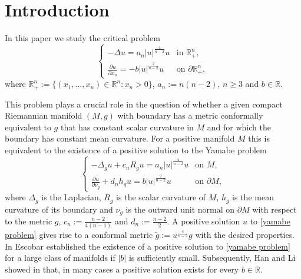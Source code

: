 \documentclass[reqno,11pt,oneside]{amsart}
\numberwithin{equation}{section}
\def\r{\mathbb{R}}
\def\rn{\mathbb{R}^n}
\def\hn{\mathbb{R}^n_+}
\def\tilde{\widetilde}
\begin{document}
\maketitle

\section{Introduction}

In this paper we study the critical problem
\begin{equation}\label{problem_cap}
\begin{cases}
 -\Delta u = a_n|u|^\frac{4}{n-2}u &\text{in \ } \hn,\\
 \frac{\partial u}{\partial x_n} = -b|u|^\frac{2}{n-2}u &\text{on \ }\partial\hn,
\end{cases}
\end{equation}
where $\hn:=\{(x_1,\ldots,x_n)\in\rn:x_n>0\}$, $a_n:=n(n-2)$, $n\geq 3$ and $b\in\r$.

This problem plays a crucial role in the question of whether a given compact Riemannian manifold $(M,g)$ with boundary has a metric conformally equivalent to $g$ that has constant scalar curvature in $M$ and for which the boundary has constant mean curvature. For a positive manifold $M$ this is equivalent to the existence of a positive solution to the Yamabe problem
\begin{equation}\label{yamabe problem}
\begin{cases}
 -\Delta_g u + c_nR_gu= a_n|u|^\frac{4}{n-2}u &\text{on \ } M,\\
 \frac{\partial u}{\partial\nu_g} + d_nh_gu= b|u|^\frac{2}{n-2}u &\text{on \ }\partial M,
\end{cases}
\end{equation}
where $\Delta_g$ is the Laplacian, $R_g$ is the scalar curvature of $M$, $h_g$ is the mean curvature of its boundary and $\nu_g$ is the outward unit normal on $\partial M$ with respect to the metric $g$, $c_n:=\frac{n-2}{4(n-1)}$ and  $d_n:=\frac{n-2}{2}$. A positive solution $u$ to \eqref{yamabe problem} gives rise to a conformal metric $\tilde{g}:=u^\frac{4}{n-2}g$ with the desired properties. In \cite{e1,e4} Escobar established the existence of a positive solution to \eqref{yamabe problem} for a large class of manifolds if $|b|$ is sufficiently small. Subsequently, Han and Li showed in \cite{hl0,hl} that, in many cases a positive solution exists for every $b\in\r$.
\end{document}
